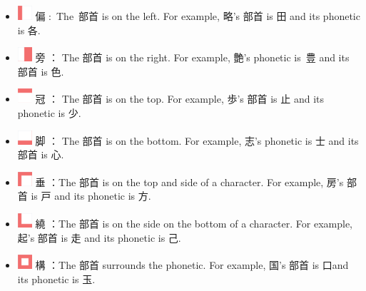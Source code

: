 \begin{itemize}

\item 
\includegraphics[scale=0.5]{figs/第08章/第359課:_the214bushu_fig/20px_Busyu___hen.png}
  偏 : The 部首 is on the left. For example, 略's 部首 is 田 and its phonetic is 各. 
\item 
\includegraphics[scale=0.5]{figs/第08章/第359課:_the214bushu_fig/20px_Busyu___tsukuri.png}
  旁 ： The 部首 is on the right. For example, 艶's phonetic is 豊 and its 部首 is 色. 
\item 
\includegraphics[scale=0.5]{figs/第08章/第359課:_the214bushu_fig/20px_Busyu___kanmuri.png}
  冠 ： The 部首 is on the top. For example, 歩's 部首 is 止 and its phonetic is 少. 
\item 
\includegraphics[scale=0.5]{figs/第08章/第359課:_the214bushu_fig/20px_Busyu___ashi.png}
  脚 ： The 部首 is on the bottom. For example, 志's phonetic is 士 and its 部首 is 心. 
\end{itemize}

\begin{itemize}

\item 
\includegraphics[scale=0.5]{figs/第08章/第359課:_the214bushu_fig/20px_Busyu___tare.png}
  垂 ：The 部首 is on the top and side of a character. For example, 房's 部首 is 戸 and its phonetic is 方. 
\item 
\includegraphics[scale=0.5]{figs/第08章/第359課:_the214bushu_fig/20px_Busyu___nyou.png}
  繞 ：The 部首 is on the side on the bottom of a character. For example, 起's 部首 is 走 and its phonetic is 己. 
\item 
\includegraphics[scale=0.5]{figs/第08章/第359課:_the214bushu_fig/20px_Busyu___kamae(1).png}
  構 ：The 部首 surrounds the phonetic. For example, 国's 部首 is 口and its phonetic is 玉. 
\end{itemize}

